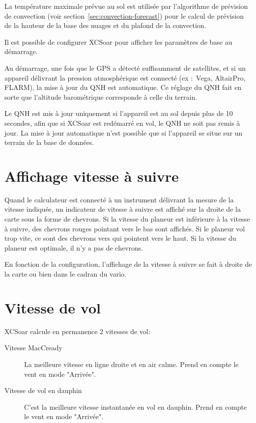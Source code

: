 La température maximale prévue au sol est utilisée par l'algorithme de prévision de convection (voir section~\ref{sec:convection-forecast}) pour le calcul de prévision de la hauteur de la base des nuages et du plafond de la convection.

\tip Il est possible de configurer XCSoar pour afficher les paramètres de base au démarrage.

Au démarrage, une fois que le GPS a détecté suffisamment de satellites,  et si un appareil délivrant la pression atmosphérique est connecté  (ex :\ Vega, AltairPro, FLARM), la mise à jour du QNH est automatique. Ce réglage du QNH fait en sorte que l'altitude barométrique corresponde à celle du terrain.

Le QNH est mis à jour uniquement si l'appareil est au sol depuis plus de 10 secondes, afin que si XCSoar est redémarré en vol, le QNH ne soit pas remis à jour. La mise à jour automatique n'est possible que si l'appareil se situe sur un terrain de la base de données.

\section{Affichage vitesse à suivre}

Quand le calculateur est connecté à un instrument délivrant la mesure de la vitesse indiquée, un indicateur de vitesse à suivre est affiché sur la droite de la carte sous la forme de chevrons. Si la vitesse du planeur est inférieure à la vitesse à suivre, des chevrons rouges pointant vers le bas sont affichés. Si le planeur vol trop vite, ce sont des chevrons vers qui pointent vers le haut. Si la vitesse du planeur est optimale, il n'y a pas de chevrons.

En fonction de la configuration, l'affichage de la vitesse à suivre se fait à droite de la carte ou bien dans le cadran du vario.

\section{Vitesse de vol}\label{sec:stf}

XCSoar calcule en permanence 2 vitesses de vol:
\begin{description}
\item[Vitesse MacCready]  La meilleure vitesse en ligne droite et en air calme. Prend en compte le vent en mode "Arrivée".
\item[Vitesse de vol en dauphin]  C'est la meilleure vitesse instantanée en vol en dauphin. Prend en compte le vent en mode "Arrivée".
\end{description}  

